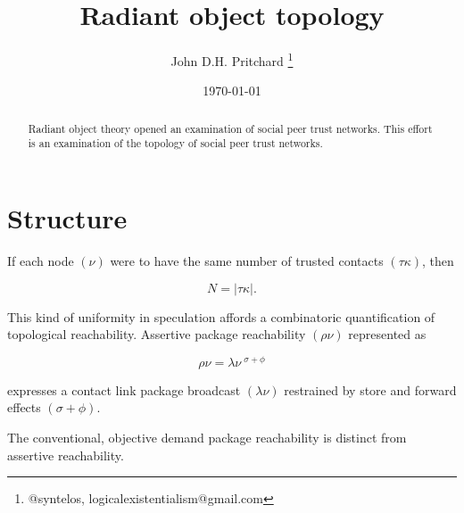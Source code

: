 \documentclass[12pt,twocolumn]{article}
\begin{document}
\title{Radiant object topology}

\author{John D.H. Pritchard \thanks{@syntelos, logicalexistentialism@gmail.com}}

\date{\today}

\maketitle


\begin{abstract}

Radiant object theory \cite{ROTI} opened an examination of social peer
trust networks.  This effort is an examination of the topology of
social peer trust networks.  
  
\end{abstract}


\section{Structure}

If each node \((\nu)\) were to have the same number of trusted
contacts \((\tau\kappa)\), then

$$
 N = | \tau\kappa | .
$$

This kind of uniformity in speculation affords a combinatoric
quantification of topological reachability.  Assertive package
\cite{RFC5050,RFC2045} reachability \((\rho\nu)\) represented as

$$
 \rho\nu = \lambda\nu~^{\sigma+\phi}
$$

expresses a contact link package broadcast \((\lambda\nu)\) restrained
by store and forward effects \((\sigma + \phi)\).  

The conventional, objective demand package reachability is distinct
from assertive reachability.  
 
\appendix



\end{document}
